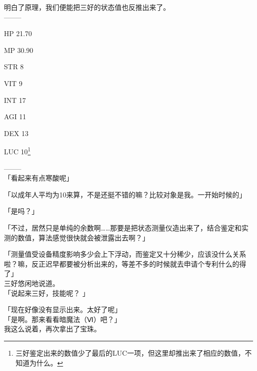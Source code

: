 明白了原理，我们便能把三好的状态值也反推出来了。\\

  --------

  HP 21.70

  MP 30.90

%  
 

  STR 8

  VIT 9

  INT 17

  AGI 11

  DEX 13

  LUC 10\footnote{三好鉴定出来的数值少了最后的LUC一项，但这里却推出来了相应的数值，不知道为什么。}

  --------\\

「看起来有点寒酸呢」

「以成年人平均为10来算，不是还挺不错的嘛？比较对象是我。一开始时候的」

「是吗？」

「不过，居然只是单纯的余数啊……那要是把状态测量仪造出来了，结合鉴定和实测的数值，算法感觉很快就会被泄露出去啊？」

「测量值受设备精度影响多少会上下浮动，而鉴定又十分稀少，应该没什么关系啦？嘛，反正迟早都要被分析出来的，等差不多的时候就去申请个专利什么的得了」\\

三好悠闲地说道。\\

「说起来三好，技能呢？ 」

「现在好像没有显示出来。太好了呢」\\

「是啊。那来看看暗魔法（Ⅵ）吧？」\\

我这么说着，再次拿出了宝珠。\\
